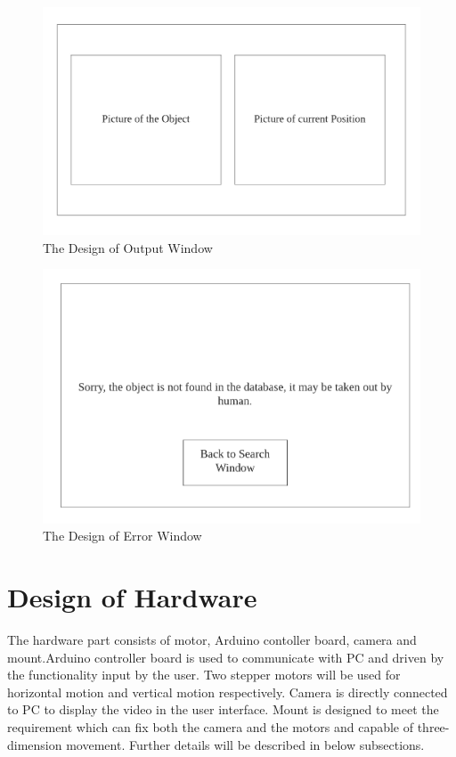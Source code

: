 \documentclass[12pt, titlepage]{article}
\begin{document}
\begin{figure}[H]
    \centering
    \includegraphics[scale=0.6]{Output.png}
    \caption{The Design of Output Window}
\end{figure}

\begin{figure}[H]
    \centering
    \includegraphics[scale=0.6]{Error.png}
    \caption{The Design of Error Window}
\end{figure}

\section{Design of Hardware}
The hardware part consists of motor, Arduino contoller board, camera and mount.Arduino controller board is used to communicate with PC and driven by the functionality input by the user. Two stepper motors will be used for horizontal motion and vertical motion respectively. Camera is directly connected to PC to display the video in the user interface. Mount is designed to meet the requirement which can fix both the camera and the motors and capable of three-dimension movement. Further details will be described in below subsections.
\end{document}
